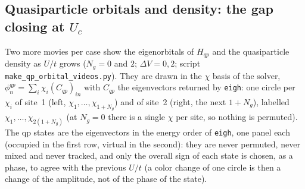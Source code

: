\documentclass[11pt]{article}
\newcommand{\Ng}{N_{g}}
\newcommand{\dV}{\Delta V}
\begin{document}
\subsection{Quasiparticle orbitals and density: the gap closing at $U_c$}

Two more movies per case show the eigenorbitals of $H_{qp}$ and the quasiparticle density as $U/t$ grows ($\Ng=0$ and $2$; $\dV=0,2$; script \texttt{make\_qp\_orbital\_videos.py}).
They are drawn in the $\chi$ basis of the solver, $\phi^{qp}_n=\sum_i\chi_i(C_{qp})_{in}$ with $C_{qp}$ the eigenvectors returned by \texttt{eigh}: one circle per $\chi_i$ of site~1 (left, $\chi_1,\dots,\chi_{1+\Ng}$) and of site~2 (right, the next $1+\Ng$), labelled $\chi_1,\dots,\chi_{2(1+\Ng)}$ (at $\Ng=0$ there is a single $\chi$ per site, so nothing is permuted). The qp states are the eigenvectors in the energy order of \texttt{eigh}, one panel each (occupied in the first row, virtual in the second): they are never permuted, never mixed and never tracked, and only the overall sign of each state is chosen, as a phase, to agree with the previous $U/t$ (a color change of one circle is then a change of the amplitude, not of the phase of the state).
\end{document}
